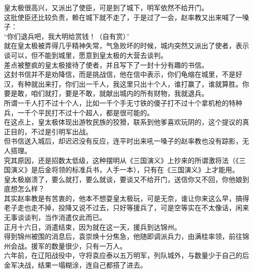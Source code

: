 \begin{multicols}{\theparacolNo}
皇太极很高兴，又派出了使臣，可是到了城下，明军依然不给开门。\\

这批使臣还比较负责，赖在城下就不走了，于是过了一会，赵率教又出来喊了一嗓子：\\

“你们退兵吧，我大明给赏钱！（自有赏）”\\

就在皇太极被弄得几乎精神失常，气急败坏的时候，城内突然又派出了使者，表示谈可以，但不能到城里，愿意到皇太极的大营去谈判。\\

差点被整疯的皇太极接待了使者，并且写下了一封十分有趣的书信。\\

这封书信并不是劝降信，而是挑战信，他在信中表示，你们龟缩在城里，不是好汉，有种就出来打，你们出一千人，我这里只出十个人，谁打赢了，谁就算胜。你要是敢，咱们就打，要是不敢，就献出城内的所有财物，我就退兵。\\

所谓一千人打不过十个人，比如一千个手无寸铁的傻子打不过十个拿机枪的特种兵，一千个平民打不过十个超人，都是很可能的。\\

在这点上，皇太极体现出游牧民族的狡猾，联系到他爹喜欢玩阴的，这个提议的真正目的，不过是引明军出战。\\

但书信送入城后，却迟迟没有反应，连平时出来吼一嗓子的赵率教也没有踪影，无人搭理。\\

究其原因，还是招数太低级，这种摆明从《三国演义》上抄来的所谓激将法（《三国演义》是后金将领的标准兵书，人手一本），只有在《三国演义》上才能用。\\

皇太极崩溃了，要么就打，要么就谈，要谈又不给开门，送信你又不回，你他娘到底想怎么样？\\

其实赵率教是有苦衷的，他本不想耍皇太极玩，可是无奈，谁让你来这么早，搞得老子走也走不掉，投降又说不过去，只好等援兵了，可是空等实在不太像话，闲来无事谈谈判，当作消遣仅此而已。\\

正月十六日，消遣结束，因为就在这一天，援兵到达锦州。\\

得到锦州被围的消息后，袁崇焕十分焦急，他随即调派兵力，由满桂率领，前往锦州会战。援军的数量很少，只有一万人。\\

六年前，在辽阳战役中，守将袁应泰以五万明军，列队城外，与数量少于自己的后金军决战，结果一塌糊涂，连自己都搭了进去。\\


\end{multicols}
